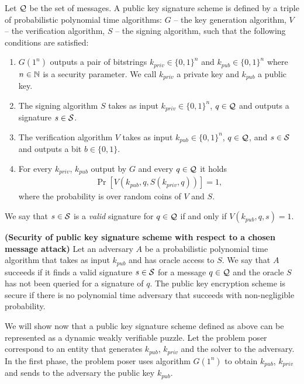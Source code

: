 \begin{definition}
Let $\mathcal{Q}$ be the set of messages. A \textnormal{public key signature scheme} is defined by a triple of probabilistic polynomial time algorithms:
$G$ -- the key generation algorithm,
$V$ -- the verification algorithm,
$S$ -- the signing algorithm,
such that the following conditions are satisfied:
\begin{enumerate}[-]
  \item $G(1^n)$ outputs a pair of bitstrings $k_{priv} \in \{0,1\}^{n}$ and $k_{pub} \in \{0,1\}^{n}$ where $n \in \mathbb{N}$ is a security parameter.
    We call $k_{priv}$ a private key and $k_{pub}$ a public key.
  \item The signing algorithm $S$ takes as input $k_{priv} \in \{0,1\}^{n}$, $q \in \mathcal{Q}$ and outputs a signature $s \in \mathcal{S}$.
  \item The verification algorithm $V$ takes as input $k_{pub} \in \{0,1\}^{n}$, $q \in \mathcal{Q}$, and $s \in \mathcal{S}$ and outputs a bit $b \in \{0,1\}$.
  \item For every $k_{priv}$, $k_{pub}$ output by $G$ and every $q \in \mathcal{Q}$ it holds
    \begin{align*}
      \Pr[V(k_{pub}, q, S(k_{priv}, q))] = 1,
    \end{align*}
    where the probability is over random coins of $V$ and $S$.
\end{enumerate}
\end{definition}
We say that $s \in \mathcal{S}$ is a \textit{valid} signature for $q \in \mathcal{Q}$ if and only if $V(k_{pub}, q, s) = 1$.
%
%
\begin{definition}\textbf{(Security of public key signature scheme with respect to a chosen message attack)}
Let an \textnormal{adversary} $A$ be a probabilistic polynomial time algorithm that takes as input $k_{pub}$ and has oracle access to $S$.
We say that $A$ \textnormal{succeeds} if it finds a valid signature $s \in \mathcal{S}$ for a message $q \in \mathcal{Q}$ and the oracle $S$ has not been queried for a signature of $q$.
The public key encryption scheme is \textnormal{secure} if there is no polynomial time adversary that succeeds with non-negligible probability.
\end{definition}
%
We will show now that a public key signature scheme defined as above can be represented as a dynamic weakly verifiable puzzle.
Let the problem poser correspond to an entity that generates $k_{pub}$, $k_{priv}$ and the solver to the adversary.
In the first phase, the problem poser uses algorithm $G(1^n)$ to obtain $k_{pub}$, $k_{priv}$ and sends to the adversary the public key $k_{pub}$.
